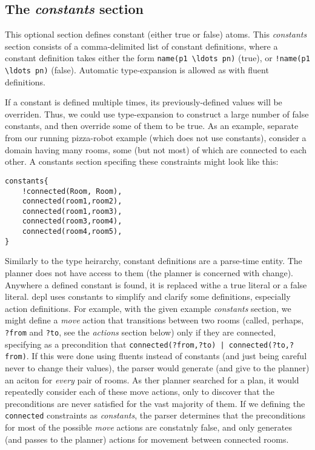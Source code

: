 \documentclass{article}
\begin{document}
\subsection{The \emph{constants} section}


This optional section defines constant (either true or false) atoms. This
\emph{constants} section consists of a comma-delimited list of constant
definitions, where a constant definition takes either the form
\verb|name(p1 \ldots pn)| (true), 
or
\verb|!name(p1 \ldots pn)| (false).
Automatic type-expansion is allowed as with fluent definitions.

If a constant is defined multiple times, its previously-defined values will be
overriden. Thus, we could use type-expansion to construct
a large number of false constants, and then
override some of them to be true. As an example, separate from our
running pizza-robot example (which does not use constants), consider a domain
having many rooms, some (but not most) of which are connected to each other.
A constants section specifing these constraints might look like this:

\begin{verbatim}
constants{
    !connected(Room, Room),
    connected(room1,room2),
    connected(room1,room3),
    connected(room3,room4),
    connected(room4,room5),
}
\end{verbatim}

Similarly to the type heirarchy, constant definitions are a parse-time entity.
The planner does not have access to them (the planner is concerned with change).
Anywhere a defined constant is found, it is replaced withe a true literal or a
false literal.  depl uses constants to simplify and clarify some definitions,
especially action definitions. For example, with the given example
\emph{constants} section, we might define a \emph{move} action that transitions
between two rooms (called, perhaps, \verb|?from| and \verb|?to|, see the
\emph{actions} section below) only if they are connected, specifying as a
precondition that \verb"connected(?from,?to) | connected(?to,?from)".  If this
were done using fluents instead of constants (and just being careful never to
change their values), the parser would generate (and give to the planner) an
aciton for \emph{every} pair of rooms. As ther planner searched for a plan, it
would repeatedly consider each of these move actions, only to discover that the
preconditions are never satisfied for the vast majority of them. If we defining
the \verb|connected| constraints as \emph{constants}, the parser determines that
the preconditions for most of the possible \emph{move} actions are constatnly
false, and only generates (and passes to the planner) actions for movement
between connected rooms.
\end{document}
